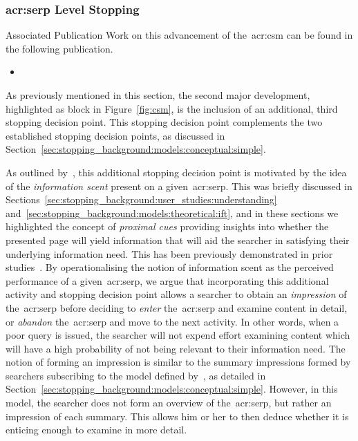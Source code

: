 \subsubsection{\gls{acr:serp} Level Stopping}
\begin{publications_box}{Associated Publication}
Work on this advancement of the~\gls{acr:csm} can be found in the following publication.
\vspace*{-2mm}
\begin{itemize}
    \item{}
\end{itemize}
\end{publications_box}

As previously mentioned in this section, the second major development, highlighted as block  in Figure~\ref{fig:csm}, is the inclusion of an additional, third stopping decision point. This stopping decision point complements the two established stopping decision points, as discussed in Section~\ref{sec:stopping_background:models:conceptual:simple}.

As outlined by~\cite{maxwell2018serp}, this additional stopping decision point is motivated by the idea of the \emph{information scent} present on a given~\gls{acr:serp}. This was briefly discussed in Sections~\ref{sec:stopping_background:user_studies:understanding} and~\ref{sec:stopping_background:models:theoretical:ift}, and in these sections we highlighted the concept of \emph{proximal cues} providing insights into whether the presented page will yield information that will aid the searcher in satisfying their underlying information need. This has been previously demonstrated in prior studies~\citep{wu2014information_scent, ong2017scent_behaviour, maxwell2017snippets}. By operationalising the notion of information scent as the perceived performance of a given~\gls{acr:serp}, we argue that incorporating this additional activity and stopping decision point allows a searcher to obtain an \emph{impression} of the~\gls{acr:serp} before deciding to \emph{enter} the~\gls{acr:serp} and examine content in detail, or \emph{abandon} the~\gls{acr:serp} and move to the next activity. In other words, when a poor query is issued, the searcher will not expend effort examining content which will have a high probability of not being relevant to their information need. The notion of forming an impression is similar to the summary impressions formed by searchers subscribing to the model defined by~\cite{thomas2014modelling_behaviour}, as detailed in Section~\ref{sec:stopping_background:models:conceptual:simple}. However, in this model, the searcher does not form an overview of the~\gls{acr:serp}, but rather an impression of each summary. This allows him or her to then deduce whether it is enticing enough to examine in more detail.

